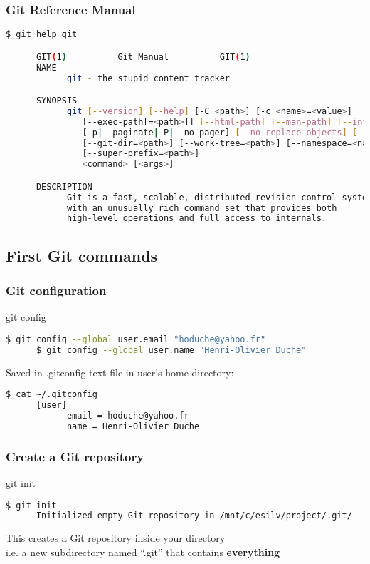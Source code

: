 \begin{frame}[fragile]\frametitle{Git Reference Manual}
   \begin{lstlisting}[language=bash, style=bash]
      $ git help git

      GIT(1)          Git Manual          GIT(1)
      NAME
            git - the stupid content tracker

      SYNOPSIS
            git [--version] [--help] [-C <path>] [-c <name>=<value>]
               [--exec-path[=<path>]] [--html-path] [--man-path] [--info-path]
               [-p|--paginate|-P|--no-pager] [--no-replace-objects] [--bare]
               [--git-dir=<path>] [--work-tree=<path>] [--namespace=<name>]
               [--super-prefix=<path>]
               <command> [<args>]

      DESCRIPTION
            Git is a fast, scalable, distributed revision control system
            with an unusually rich command set that provides both
            high-level operations and full access to internals.
   \end{lstlisting}
\end{frame}

\subsection{First Git commands}

\begin{frame}[fragile]\frametitle{Git configuration}
   \begin{center}
      \Huge git config \normalsize
   \end{center}
   \begin{lstlisting}[language=bash, style=bash]
      $ git config --global user.email "hoduche@yahoo.fr"
      $ git config --global user.name "Henri-Olivier Duche"
   \end{lstlisting}
   Saved in .gitconfig text file in user's home directory:
   \begin{lstlisting}[language=bash, style=bash, autogobble]
      $ cat ~/.gitconfig
      [user]
            email = hoduche@yahoo.fr
            name = Henri-Olivier Duche
   \end{lstlisting}
\end{frame}

\begin{frame}[fragile]\frametitle{Create a Git repository}
   \begin{center}
      \Huge git init \normalsize
   \end{center}
   \begin{lstlisting}[language=bash, style=bash]
      $ git init
      Initialized empty Git repository in /mnt/c/esilv/project/.git/
   \end{lstlisting}
   This creates a Git repository inside your directory \\
   i.e. a new subdirectory named ``.git''
   that contains \textbf{everything}
\end{frame}

